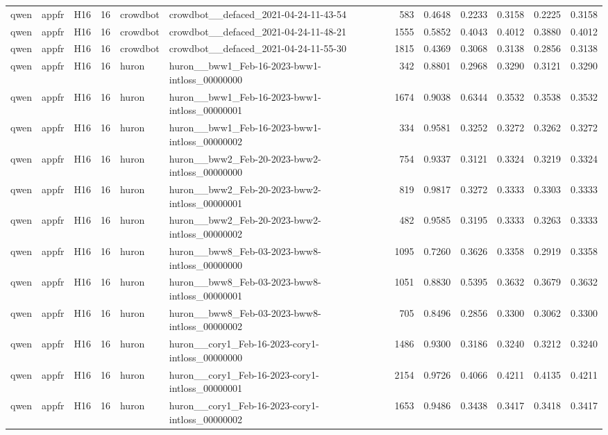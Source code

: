 \begin{table}[tbp]
\begin{tabular}{lllrllrrrrrr}
qwen & appfr & H16 & 16 & crowdbot & crowdbot\_\_defaced\_2021-04-24-11-43-54 & 583 & 0.4648 & 0.2233 & 0.3158 & 0.2225 & 0.3158 \\
qwen & appfr & H16 & 16 & crowdbot & crowdbot\_\_defaced\_2021-04-24-11-48-21 & 1555 & 0.5852 & 0.4043 & 0.4012 & 0.3880 & 0.4012 \\
qwen & appfr & H16 & 16 & crowdbot & crowdbot\_\_defaced\_2021-04-24-11-55-30 & 1815 & 0.4369 & 0.3068 & 0.3138 & 0.2856 & 0.3138 \\
qwen & appfr & H16 & 16 & huron & huron\_\_bww1\_Feb-16-2023-bww1-intloss\_00000000 & 342 & 0.8801 & 0.2968 & 0.3290 & 0.3121 & 0.3290 \\
qwen & appfr & H16 & 16 & huron & huron\_\_bww1\_Feb-16-2023-bww1-intloss\_00000001 & 1674 & 0.9038 & 0.6344 & 0.3532 & 0.3538 & 0.3532 \\
qwen & appfr & H16 & 16 & huron & huron\_\_bww1\_Feb-16-2023-bww1-intloss\_00000002 & 334 & 0.9581 & 0.3252 & 0.3272 & 0.3262 & 0.3272 \\
qwen & appfr & H16 & 16 & huron & huron\_\_bww2\_Feb-20-2023-bww2-intloss\_00000000 & 754 & 0.9337 & 0.3121 & 0.3324 & 0.3219 & 0.3324 \\
qwen & appfr & H16 & 16 & huron & huron\_\_bww2\_Feb-20-2023-bww2-intloss\_00000001 & 819 & 0.9817 & 0.3272 & 0.3333 & 0.3303 & 0.3333 \\
qwen & appfr & H16 & 16 & huron & huron\_\_bww2\_Feb-20-2023-bww2-intloss\_00000002 & 482 & 0.9585 & 0.3195 & 0.3333 & 0.3263 & 0.3333 \\
qwen & appfr & H16 & 16 & huron & huron\_\_bww8\_Feb-03-2023-bww8-intloss\_00000000 & 1095 & 0.7260 & 0.3626 & 0.3358 & 0.2919 & 0.3358 \\
qwen & appfr & H16 & 16 & huron & huron\_\_bww8\_Feb-03-2023-bww8-intloss\_00000001 & 1051 & 0.8830 & 0.5395 & 0.3632 & 0.3679 & 0.3632 \\
qwen & appfr & H16 & 16 & huron & huron\_\_bww8\_Feb-03-2023-bww8-intloss\_00000002 & 705 & 0.8496 & 0.2856 & 0.3300 & 0.3062 & 0.3300 \\
qwen & appfr & H16 & 16 & huron & huron\_\_cory1\_Feb-16-2023-cory1-intloss\_00000000 & 1486 & 0.9300 & 0.3186 & 0.3240 & 0.3212 & 0.3240 \\
qwen & appfr & H16 & 16 & huron & huron\_\_cory1\_Feb-16-2023-cory1-intloss\_00000001 & 2154 & 0.9726 & 0.4066 & 0.4211 & 0.4135 & 0.4211 \\
qwen & appfr & H16 & 16 & huron & huron\_\_cory1\_Feb-16-2023-cory1-intloss\_00000002 & 1653 & 0.9486 & 0.3438 & 0.3417 & 0.3418 & 0.3417 \\

\end{tabular}
\end{table}
